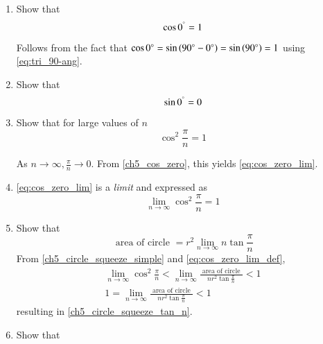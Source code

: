 \begin{enumerate}[label=\arabic*.,ref=\thesubsection.\theenumi]
%
\item
	Show that 
	\begin{equation}
	\label{ch5_cos_zero}
	\cos 0^{\degree} = 1
	\end{equation}

\solution Follows from the fact that $\cos 0 \degree = \sin \left(90\degree -0\degree\right) = \sin \left(90\degree \right)=1$ using \eqref{eq:tri_90-ang}.



\item
	Show that 
	\begin{equation}
	\label{ch5_sin_zero}
	\sin 0^{\degree} = 0
	\end{equation}

\item
	Show that for large values of $n$
	\begin{equation}
\label{eq:cos_zero_lim}
\cos^2\frac{\pi}{n} = 1
%
	\end{equation}	

%
\solution  As $n \to \infty, \frac{\pi}{n} \to 0$. From \eqref{ch5_cos_zero}, this yields \eqref{eq:cos_zero_lim}.

%
\item  \eqref{eq:cos_zero_lim} is a {\em limit} and 
	 expressed as 
%
\begin{equation}
\label{eq:cos_zero_lim_def}
\lim_{n \rightarrow \infty}\cos^2\frac{\pi}{n} = 1
\end{equation}
%	

\item
	Show that 
\begin{equation}
\label{ch5_circle_squeeze_tan_n}
\text{ area of circle } = r^2\lim_{n \rightarrow \infty}
{n\tan\frac{\pi}{n}} 
\end{equation}	
\solution From \eqref{ch5_circle_squeeze_simple} and \eqref{eq:cos_zero_lim_def}, 
	\begin{align}
\lim_{n\to \infty}\cos^2\frac{\pi}{n} < \lim_{n\to \infty} \frac{\text{ area of circle }}{nr^{2}\tan\frac{\pi}{n}} < 1	
\\
1 = \lim_{n\to \infty} \frac{\text{ area of circle }}{nr^{2}\tan\frac{\pi}{n}} < 1	
\end{align}
resulting in \eqref{ch5_circle_squeeze_tan_n}.
%

%
\item Show that 


\end{enumerate}
